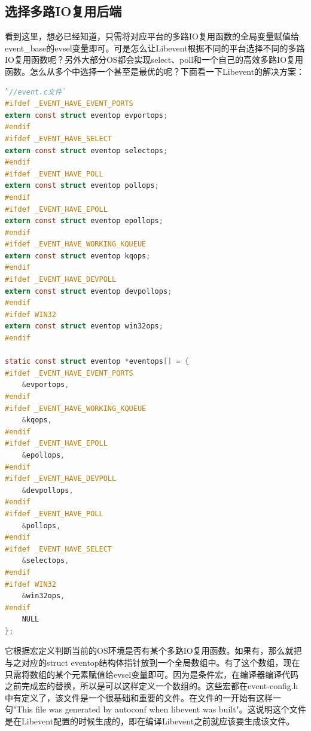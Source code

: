 \documentclass[11pt,a4paper]{article}
\begin{document}
\subsection{选择多路IO复用后端}
看到这里，想必已经知道，只需将对应平台的多路IO复用函数的全局变量赋值给event\_base的evsel变量即可。可是怎么让Libevent根据不同的平台选择不同的多路IO复用函数呢？另外大部分OS都会实现select、poll和一个自己的高效多路IO复用函数。怎么从多个中选择一个甚至是最优的呢？下面看一下Libevent的解决方案：
\begin{lstlisting}[language=C]
`//event.c文件`
#ifdef _EVENT_HAVE_EVENT_PORTS  
extern const struct eventop evportops;
#endif
#ifdef _EVENT_HAVE_SELECT
extern const struct eventop selectops;
#endif
#ifdef _EVENT_HAVE_POLL
extern const struct eventop pollops;
#endif
#ifdef _EVENT_HAVE_EPOLL
extern const struct eventop epollops;
#endif
#ifdef _EVENT_HAVE_WORKING_KQUEUE
extern const struct eventop kqops;
#endif
#ifdef _EVENT_HAVE_DEVPOLL
extern const struct eventop devpollops;
#endif
#ifdef WIN32
extern const struct eventop win32ops;
#endif

static const struct eventop *eventops[] = {
#ifdef _EVENT_HAVE_EVENT_PORTS
	&evportops,
#endif
#ifdef _EVENT_HAVE_WORKING_KQUEUE
	&kqops,
#endif
#ifdef _EVENT_HAVE_EPOLL
	&epollops,
#endif
#ifdef _EVENT_HAVE_DEVPOLL
	&devpollops,
#endif
#ifdef _EVENT_HAVE_POLL
	&pollops,
#endif
#ifdef _EVENT_HAVE_SELECT
	&selectops,
#endif
#ifdef WIN32
	&win32ops,
#endif
	NULL
};
\end{lstlisting}

它根据宏定义判断当前的OS环境是否有某个多路IO复用函数。如果有，那么就把与之对应的struct eventop结构体指针放到一个全局数组中。有了这个数组，现在只需将数组的某个元素赋值给evsel变量即可。因为是条件宏，在编译器编译代码之前完成宏的替换，所以是可以这样定义一个数组的。这些宏都在event-config.h中有定义了，该文件是一个很基础和重要的文件。在文件的一开始有这样一句"This file was generated by autoconf when libevent was built"。这说明这个文件是在Libevent配置的时候生成的，即在编译Libevent之前就应该要生成该文件。
\end{document}
